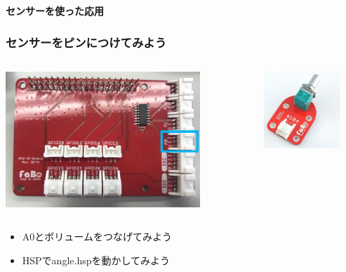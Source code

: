 \begin{frame}[plain]
    \begin{center}
        \vspace{48pt}
        {\huge\bf センサーを使った応用}
    \end{center}
\end{frame}

\begin{frame}
    \frametitle{センサーをピンにつけてみよう}
    \begin{center}
        \begin{columns}
            \begin{column}{0.48\textwidth}
                \includegraphics[width=0.8\textwidth]{images/chap05/text05-img030.png}
            \end{column}
            \begin{column}{0.48\textwidth}
                \includegraphics[width=0.8\textwidth]{images/chap05/text05-img022.jpg} 
            \end{column}
        \end{columns}
        \begin{itemize}
            \item A0とボリュームをつなげてみよう
            \item HSPでangle.hspを動かしてみよう
        \end{itemize}
    \end{center}
\end{frame}

